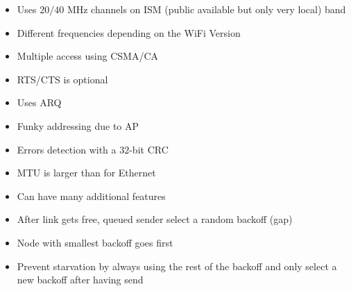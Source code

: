 \begin{itemize}
\begin{itemize}
\begin{itemize}
                        \begin{itemize}
                            \item Uses $20/40$ MHz channels on ISM (public available but only very local) band
                            \item Different frequencies depending on the WiFi Version
                        \end{itemize}
                        \begin{itemize}
                            \item Multiple access using CSMA/CA
                            \item RTS/CTS is optional
                            \item Uses ARQ
                            \item Funky addressing due to AP 
                            \item Errors detection with a $32$-bit CRC
                            \item MTU is larger than for Ethernet
                            \item Can have many additional features
                        \end{itemize}
                        \begin{itemize}
                            \item After link gets free, queued sender select a random backoff (gap)
                            \item Node with smallest backoff goes first
                            \item Prevent starvation by always using the rest of the backoff and only select a new backoff after having send
                        \end{itemize}
                \end{itemize}
        \end{itemize}
\end{itemize}


